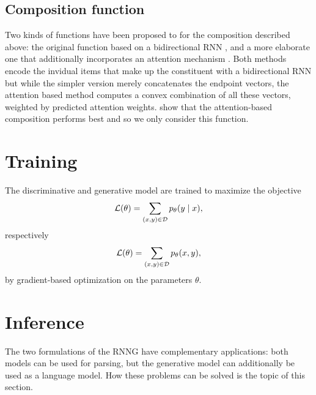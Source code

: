 \subsection{Composition function}
Two kinds of functions have been proposed to for the composition described above: the original function based on a bidirectional RNN \citep{dyer2016rnng}, and a more elaborate one that additionally incorporates an attention mechanism \citep{kuncoro2017syntax}. Both methods encode the invidual items that make up the constituent with a bidirectional RNN but while the simpler version merely concatenates the endpoint vectors, the attention based method computes a convex combination of all these vectors, weighted by predicted attention weights. \citet{kuncoro2017syntax} show that the attention-based composition performs best and so we only consider this function.

\section{Training}
The discriminative and generative model are trained to maximize the objective
\begin{align*}
  \mathcal{L}(\theta) = \sum_{(x, y) \in \mathcal{D}} p_{\theta} (y \mid x),
\end{align*}
respectively
\begin{align*}
  \mathcal{L}(\theta) = \sum_{(x, y) \in \mathcal{D}} p_{\theta} (x, y),
\end{align*}
by gradient-based optimization on the parameters $\theta$.

\section{Inference}
The two formulations of the RNNG have complementary applications: both models can be used for parsing, but the generative model can additionally be used as a language model. How these problems can be solved is the topic of this section.

